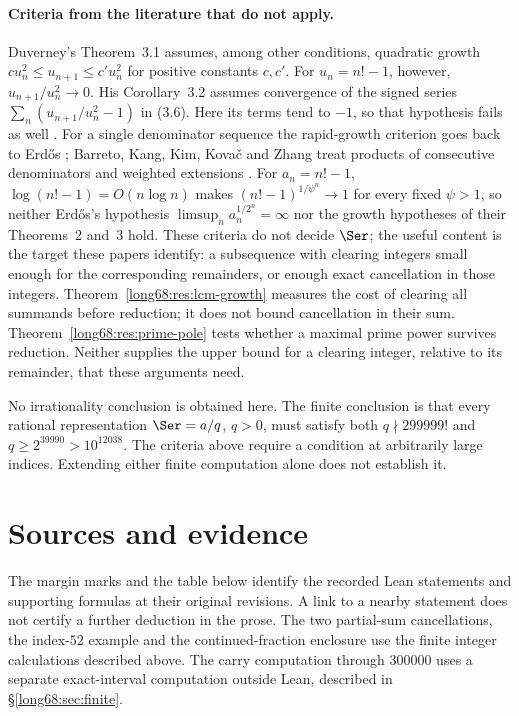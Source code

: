 \paragraph{Criteria from the literature that do not apply.}
Duverney's Theorem~3.1 assumes, among other conditions, quadratic growth
$cu_n^2\le u_{n+1}\le c'u_n^2$ for positive constants $c,c'$. For
$u_n=n!-1$, however, $u_{n+1}/u_n^2\to0$. His Corollary~3.2 assumes
convergence of the signed series $\sum_n(u_{n+1}/u_n^2-1)$ in (3.6).
Here its terms tend to $-1$, so that hypothesis fails as well
\cite[pp.~275, 285--287]{duverney}.  For a single denominator sequence
the rapid-growth criterion goes back to Erd\H{o}s
\cite[Theorem~1, p.~1]{erdos1975}; Barreto, Kang, Kim, Kova\v{c} and Zhang
treat products of consecutive denominators and weighted extensions
\cite[Thms.~2--3 and Rem.~4]{barreto-et-al}.  For $a_n=n!-1$,
$\log(n!-1)=O(n\log n)$ makes $(n!-1)^{1/\psi^n}\to1$ for every fixed
$\psi>1$, so neither Erd\H{o}s's hypothesis
$\limsup_na_n^{1/2^n}=\infty$ nor the growth hypotheses of their Theorems~2
and~3 hold.  These criteria do not decide $\Ser$; the useful content is the
target these papers identify: a subsequence with clearing integers small enough for the corresponding
remainders, or enough exact cancellation in those integers.
Theorem~\ref{long68:res:lcm-growth} measures the cost of clearing all
summands before reduction; it does not bound cancellation in their sum.
Theorem~\ref{long68:res:prime-pole} tests whether a maximal prime power
survives reduction. Neither supplies the upper bound for a clearing
integer, relative to its remainder, that these arguments need.

\medskip
\noindent No irrationality conclusion is obtained here.  The finite
conclusion is that every rational representation $\Ser=a/q$, $q>0$, must
satisfy both $q\nmid299999!$ and $q\ge2^{39990}>10^{12038}$.
The criteria above require a condition at arbitrarily large indices.
Extending either finite computation alone does not establish it.

\section*{Sources and evidence}
\evidenceparagraph{\evidencerecordurl}

The margin marks and the table below identify the recorded Lean
statements and supporting formulas at their original revisions. A link
to a nearby statement does not certify a further deduction in the prose.
The two partial-sum cancellations, the index-$52$ example and the
continued-fraction enclosure use the finite integer calculations
described above. The carry computation through $300000$ uses a separate
exact-interval computation outside Lean, described in
\S\ref{long68:sec:finite}.

